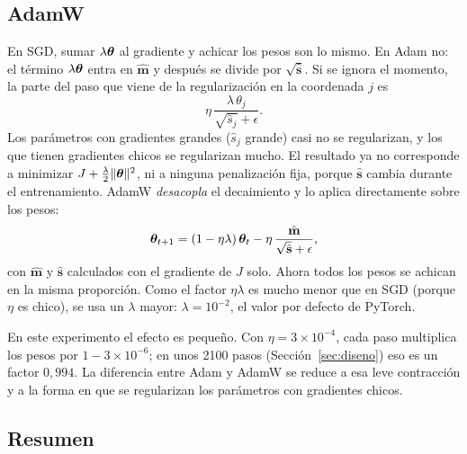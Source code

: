 \subsection{AdamW \parencite{loshchilov2019}}

En SGD, sumar $\lambda\boldsymbol{\theta}$ al gradiente y achicar los pesos son lo mismo. En Adam no: el término $\lambda\boldsymbol{\theta}$ entra en
$\hat{\mathbf{m}}$ y después se divide por $\sqrt{\hat{\mathbf{s}}}$. Si se ignora el momento, la parte del paso que viene de la
regularización en la coordenada $j$ es
\begin{equation}
  \eta\,\frac{\lambda\,\theta_j}{\sqrt{\hat s_j} + \epsilon}.
\end{equation}
Los parámetros con gradientes grandes ($\hat s_j$ grande) casi no se regularizan, y los que tienen gradientes chicos se
regularizan mucho. El resultado ya no corresponde a minimizar $J + \frac{\lambda}{2}\lVert\boldsymbol{\theta}\rVert^2$, ni a ninguna penalización
fija, porque $\hat{\mathbf{s}}$ cambia durante el entrenamiento. AdamW \emph{desacopla} el decaimiento y lo aplica directamente
sobre los pesos:
\begin{equation}
  \boldsymbol{\theta}_{t+1} = (1 - \eta\lambda)\,\boldsymbol{\theta}_t - \eta\,\frac{\hat{\mathbf{m}}}{\sqrt{\hat{\mathbf{s}}} + \epsilon},
  \label{eq:adamw}
\end{equation}
con $\hat{\mathbf{m}}$ y $\hat{\mathbf{s}}$ calculados con el gradiente de $J$ solo. Ahora todos los pesos se achican en la misma
proporción. Como el factor $\eta\lambda$ es mucho menor que en SGD (porque $\eta$ es chico), se usa un $\lambda$ mayor:
$\lambda = 10^{-2}$, el valor por defecto de PyTorch.

En este experimento el efecto es pequeño. Con $\eta = 3\times10^{-4}$, cada paso multiplica los pesos por
$1 - 3\times10^{-6}$; en unos 2100 pasos (Sección~\ref{sec:diseno}) eso es un factor $0{,}994$. La diferencia entre Adam y AdamW
se reduce a esa leve contracción y a la forma en que se regularizan los parámetros con gradientes chicos.

\subsection{Resumen}


